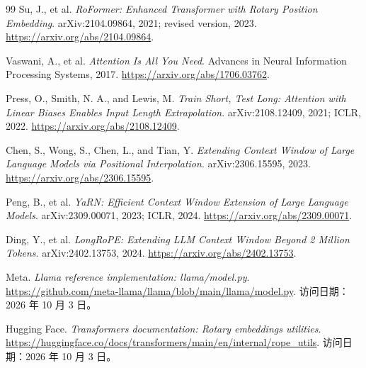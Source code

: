 \documentclass[UTF8,12pt,a4paper,fontset=fandol]{ctexart}
\begin{document}
\begin{thebibliography}{99}
Su, J., et al.
\emph{RoFormer: Enhanced Transformer with Rotary Position Embedding}.
arXiv:2104.09864, 2021; revised version, 2023.
\url{https://arxiv.org/abs/2104.09864}.

Vaswani, A., et al.
\emph{Attention Is All You Need}.
Advances in Neural Information Processing Systems, 2017.
\url{https://arxiv.org/abs/1706.03762}.

Press, O., Smith, N. A., and Lewis, M.
\emph{Train Short, Test Long: Attention with Linear Biases Enables Input Length Extrapolation}.
arXiv:2108.12409, 2021; ICLR, 2022.
\url{https://arxiv.org/abs/2108.12409}.

Chen, S., Wong, S., Chen, L., and Tian, Y.
\emph{Extending Context Window of Large Language Models via Positional Interpolation}.
arXiv:2306.15595, 2023.
\url{https://arxiv.org/abs/2306.15595}.

Peng, B., et al.
\emph{YaRN: Efficient Context Window Extension of Large Language Models}.
arXiv:2309.00071, 2023; ICLR, 2024.
\url{https://arxiv.org/abs/2309.00071}.

Ding, Y., et al.
\emph{LongRoPE: Extending LLM Context Window Beyond 2 Million Tokens}.
arXiv:2402.13753, 2024.
\url{https://arxiv.org/abs/2402.13753}.

Meta.
\emph{Llama reference implementation: llama/model.py}.
\url{https://github.com/meta-llama/llama/blob/main/llama/model.py}.
访问日期：2026 年 10 月 3 日。

Hugging Face.
\emph{Transformers documentation: Rotary embeddings utilities}.
\url{https://huggingface.co/docs/transformers/main/en/internal/rope_utils}.
访问日期：2026 年 10 月 3 日。
\end{thebibliography}
\end{document}
